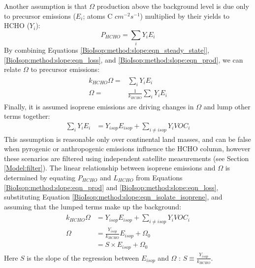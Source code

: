     Another assumption is that $\Omega$ production above the background level is due only to precursor emissions ($E_i$; atoms C $cm^{-2} s^{-1}$) multiplied by their yields to HCHO ($Y_i$):
    \begin{equation}
      \label{BioIsop:method:slope:eqn_prod}
      P_{HCHO}  = \sum_i Y_i E_i 
    \end{equation}
    By combining Equations \ref{BioIsop:method:slope:eqn_steady_state]}, \ref{BioIsop:method:slope:eqn_loss}, and \ref{BioIsop:method:slope:eqn_prod}, we can relate $\Omega$ to precursor emissions:
    \begin{eqnarray} \begin{split}
      k_{HCHO} \Omega = & \sum_i Y_i E_i \\
      \Omega = & \frac{1}{k_{HCHO}} \sum_i Y_i E_i
    \end{split} \end{eqnarray}
    Finally, it is assumed isoprene emissions are driving changes in $\Omega$ \parencite[as assumed elsewhere, e.g.,][]{Palmer2003,Millet2008,Marais2014,Stavrakou2015} and lump other terms together:
    \begin{eqnarray}
      \label{BioIsop:method:slope:eqn_isolate_isoprene}
      \sum_i Y_i E_i  & = Y_{isop} E_{isop} + \sum_{i \ne isop} Y_{i} VOC_{i} 
    \end{eqnarray}
    This assumption is reasonable only over continental land masses, and can be false when pyrogenic or anthropogenic emissions influence the HCHO column, however these scenarios are filtered using independent satellite measurements (see Section \ref{Model:filter}).
    The linear relationship between isoprene emissions and $\Omega$ is determined by equating $P_{HCHO}$ and $L_{HCHO}$ from Equations \ref{BioIsop:method:slope:eqn_prod} and \ref{BioIsop:method:slope:eqn_loss}, substituting Equation \ref{BioIsop:method:slope:eqn_isolate_isoprene}, and assuming that the lumped terms make up the background:
    \begin{eqnarray} 
      \label{BioIsop:method:slope:eqn_isop_to_hcho}
      \begin{split}
        k_{HCHO}\Omega 
        & = Y_{isop} E_{isop} + \sum_{i \ne isop} Y_{i} VOC_{i} \\
        \Omega 
        & = \frac{Y_{isop}}{k_{HCHO}} E_{isop} + \Omega_0 \\
        & = S \times E_{isop} + \Omega_0
      \end{split} 
    \end{eqnarray}
    Here $S$ is the slope of the regression between $E_{isop}$ and $\Omega$ : $S \equiv \frac{Y_{isop}}{k_{HCHO}}$.
    

